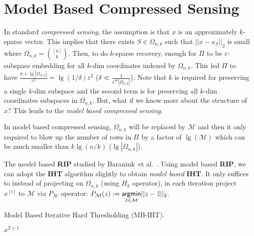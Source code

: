 \documentclass[11pt]{article}
\newcommand{\eps}{\varepsilon}
\begin{document}
\section{Model Based Compressed Sensing}

In standard {\em compressed sensing}, the assumption is that $x$ is an approximately $k$-sparse vector. This implies that there exists $S\in \Omega_{n,k}$ such that $||x-x_S||_2$ is small where $\Omega_{n,k} = {[n] \choose k}$. Then, to do $k$-sparse recovery, enough for $\Pi$ to be $\eps$-subspace embedding for all $k$-dim coordinates indexed by $\Omega_{n,k}$. This led $\Pi$ to have $\frac{k + \lg|\Omega_{n,k}|}{\eps^2} = {\lg(1/\delta)}{\eps^2}$ ($\delta \ll \frac{1}{C^k |\Omega_{n,k}|}$). 
Note that $k$ is required for preserving a single $k$-dim subspace and the second term is for preserving all $k$-dim coordinates subspaces in $\Omega_{n,k}$.  But, what if we know more about the structure of $x$? This leads to the {\em model based compressed sensing}.  

In model based compressed sensing, $\Omega_{n,k}$ will be replaced by $\mathcal{M}$ and then it only required to blow up the number of rows in $\Pi$ by a factor of $\lg(\mathcal{M})$ which can be much smaller than $k\lg (n/k)$ ($\lg |\Omega_{n,k}|$).

The model based {\bf RIP} studied by Baraniuk~{et al.}~\cite{BaraniukCDH10}. Using model based {\bf RIP}, we can adopt the {\bf IHT} algorithm slightly to obtain {\em model based} {\bf IHT}. It only suffices to instead of projecting on $\Omega_{n,k}$ (using $H_k$ operator), in each iteration project $x^{[t]}$ to $\mathcal{M}$ via $P_{\mathcal{M}}$ operator: $P_{\mathcal{M}}(z) := \underset{\hat{z}\in \mathcal{M}}{\sf argmin} ||z-\hat{z}||_2$.

\begin{algorithm}
  \caption{Model Based Iterative Hard Thresholding (MB-IHT).
   \label{alg:iht}}
  \begin{algorithmic}[1]
		\EndFor
		 $x^{T+1}$
    \EndFunction
  \end{algorithmic}
\end{algorithm}
\end{document}
